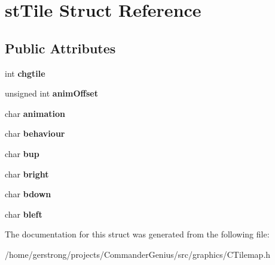 \hypertarget{structst_tile}{
\section{stTile Struct Reference}
\label{structst_tile}
}
\subsection*{Public Attributes}
\begin{DoxyCompactItemize}
\item 
\hypertarget{structst_tile_aa03255ef106872ddc103733310af7466}{
int {\bfseries chgtile}}
\label{structst_tile_aa03255ef106872ddc103733310af7466}

\item 
\hypertarget{structst_tile_a96f4aa478d152cfa9572b5f9cd22ceca}{
unsigned int {\bfseries animOffset}}
\label{structst_tile_a96f4aa478d152cfa9572b5f9cd22ceca}

\item 
\hypertarget{structst_tile_a7f2d0fb68eb9c3de47436b207393d399}{
char {\bfseries animation}}
\label{structst_tile_a7f2d0fb68eb9c3de47436b207393d399}

\item 
\hypertarget{structst_tile_ab07cabcb8c83324c592ec740997008b6}{
char {\bfseries behaviour}}
\label{structst_tile_ab07cabcb8c83324c592ec740997008b6}

\item 
\hypertarget{structst_tile_ab8d349f2ae6bc7b381c4a471fc49af03}{
char {\bfseries bup}}
\label{structst_tile_ab8d349f2ae6bc7b381c4a471fc49af03}

\item 
\hypertarget{structst_tile_acf863e9c46bdbb9befde7bf59883e73b}{
char {\bfseries bright}}
\label{structst_tile_acf863e9c46bdbb9befde7bf59883e73b}

\item 
\hypertarget{structst_tile_a19e4287a7b364e79d080dcc2ccfa5536}{
char {\bfseries bdown}}
\label{structst_tile_a19e4287a7b364e79d080dcc2ccfa5536}

\item 
\hypertarget{structst_tile_a8468d95db3e278bcfee6d00e2d08c771}{
char {\bfseries bleft}}
\label{structst_tile_a8468d95db3e278bcfee6d00e2d08c771}

\end{DoxyCompactItemize}


The documentation for this struct was generated from the following file:\begin{DoxyCompactItemize}
\item 
/home/gerstrong/projects/CommanderGenius/src/graphics/CTilemap.h\end{DoxyCompactItemize}
